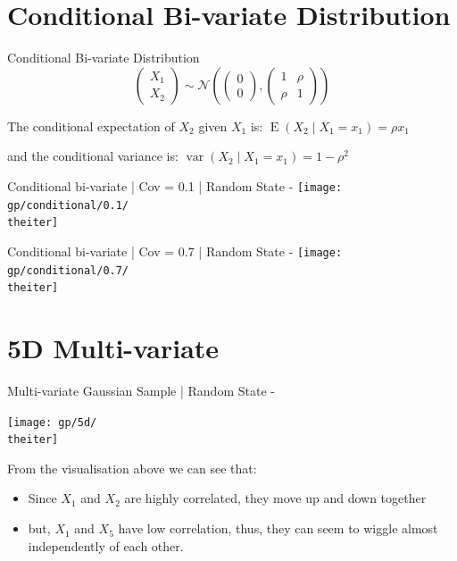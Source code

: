 \documentclass{beamer}
\begin{document}
\section{Conditional Bi-variate Distribution}

\begin{frame}{Conditional Bi-variate Distribution}
$$
\begin{pmatrix}
	X_1 \\
	X_2
\end{pmatrix}  \sim \mathcal{N} \left( \begin{pmatrix}
	0 \\
	0
\end{pmatrix} , \begin{pmatrix}
	1 & \rho \\
	\rho & 1
\end{pmatrix} \right)
$$

The conditional expectation of $X_2$ given $X_1$ is: $\operatorname{E}(X_2 \mid X_1=x_1)= \rho x_1$

and the conditional variance is: $\operatorname{var}(X_2 \mid X_1 = x_1) = 1-\rho^2$
\end{frame}

%
{%
	\begin{frame}{Conditional bi-variate | Cov = 0.1 | Random State - \theiter}
		\texttt{[image: gp/conditional/0.1/\\theiter]}
	\end{frame}
}

%
{%
	\begin{frame}{Conditional bi-variate | Cov = 0.7 | Random State - \theiter}
		\texttt{[image: gp/conditional/0.7/\\theiter]}
	\end{frame}
}

\section{5D Multi-variate}

%
{%
	\begin{frame}{Multi-variate Gaussian Sample | Random State - \theiter}
		\begin{center}
			\texttt{[image: gp/5d/\\theiter]}
		\end{center}
		From the visualisation above we can see that:
		\begin{itemize}
			\item Since $X_1$ and $X_2$ are highly correlated, they move up and down together
			\item but, $X_1$ and $X_5$ have low correlation, thus, they can seem to wiggle almost independently of each other.
		\end{itemize}
	\end{frame}
}
\end{document}
